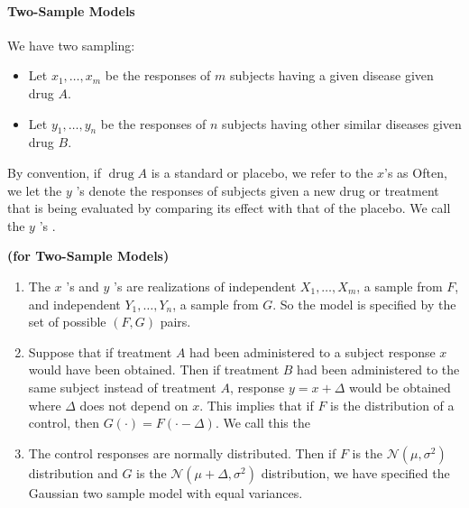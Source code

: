 \documentclass{article}
\newcommand{\bfs}[1]{\textbf{({#1}) }}
\begin{document}
\paragraph{Two-Sample Models}
\begin{exma}\label{ex:twosample} We have two sampling:
\begin{itemize}
    \item Let $x_{1}, \ldots, x_{m}$ be the responses of $m$ subjects having a given disease given drug $A$.
    \item Let $y_{1}, \ldots, y_{n}$ be the responses of $n$ subjects having other similar diseases given drug $B$.
\end{itemize}
By convention, if $\operatorname{drug} A$ is a standard or placebo, we refer to the $x$'s as  Often, we let the $y$ 's denote the responses of subjects given a new drug or treatment that is being evaluated by comparing its effect with that of the placebo. We call the $y$ 's .
\end{exma}
\begin{assuma}\bfs{for Two-Sample Models}

\begin{enumerate}[(1).]
\item {}  The $x$ 's and $y$ 's are realizations of independent $X_{1}, \ldots, X_{m}$, a sample from $F$, and independent $Y_{1}, \ldots, Y_{n}$, a sample from $G$. So the model is specified by the set of possible $(F, G)$ pairs.
\item {} Suppose that if treatment $A$ had been administered to a subject response $x$ would have been obtained. Then if treatment $B$ had been administered to the same subject instead of treatment $A$, response $y=x+\Delta$ would be obtained where $\Delta$ does not depend on $x$. This implies that if $F$ is the distribution of a control, then $G(\cdot)=F(\cdot-\Delta)$. We call this the 
\item {} The control responses are normally distributed. Then if $F$ is the $\mathcal{N}\left(\mu, \sigma^{2}\right)$ distribution and $G$ is the $\mathcal{N}\left(\mu+\Delta, \sigma^{2}\right)$ distribution, we have specified the Gaussian two sample model with equal variances.
\end{enumerate}
\end{assuma}
\end{document}
